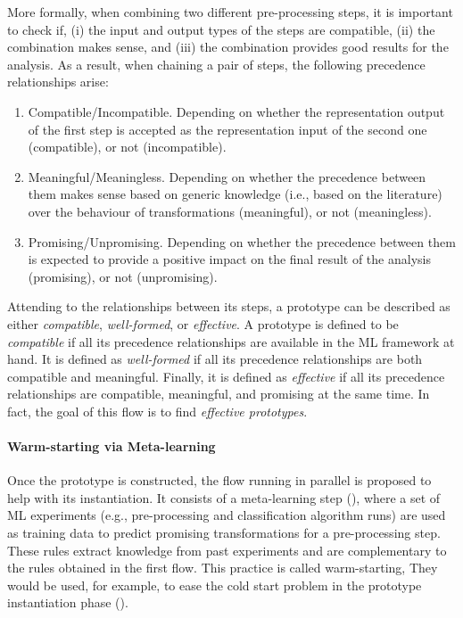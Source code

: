 More formally, when combining two different pre-processing steps, it is important to check if, (i) the input and output types of the steps are compatible, (ii) the combination makes sense, and (iii) the combination provides good results for the analysis.
As a result, when chaining a pair of steps, the following precedence relationships arise:
\begin{enumerate}
    \item Compatible/Incompatible. Depending on whether the representation output of the first step is accepted as the representation input of the second one (compatible), or not (incompatible).
    \item Meaningful/Meaningless. Depending on whether the precedence between them makes sense based on generic knowledge (i.e., based on the literature) over the behaviour of transformations (meaningful), or not (meaningless).
    \item Promising/Unpromising. Depending on whether the precedence between them is expected to provide a positive impact on the final result of the analysis (promising), or not (unpromising).
\end{enumerate}

Attending to the relationships between its steps, a prototype can be described as either \textit{compatible}, \textit{well-formed}, or \textit{effective}.
A prototype is defined to be \textit{compatible} if all its precedence relationships are available in the ML framework at hand.
It is defined as \textit{well-formed} if all its precedence relationships are both compatible and meaningful.
Finally, it is defined as \textit{effective} if all its precedence relationships are compatible, meaningful, and promising at the same time.
In fact, the goal of this flow is to find \textit{effective prototypes}.

\paragraph{Warm-starting via Meta-learning} Once the prototype is constructed, the flow running in parallel is proposed to help with its instantiation.
It consists of a meta-learning step  (), where a set of ML experiments (e.g., pre-processing and classification algorithm runs) are used as training data to predict promising transformations for a pre-processing step.
These rules extract knowledge from past experiments and are complementary to the rules obtained in the first flow.
This practice is called warm-starting,
They would be used, for example, to ease the cold start problem in the prototype instantiation phase  ().

